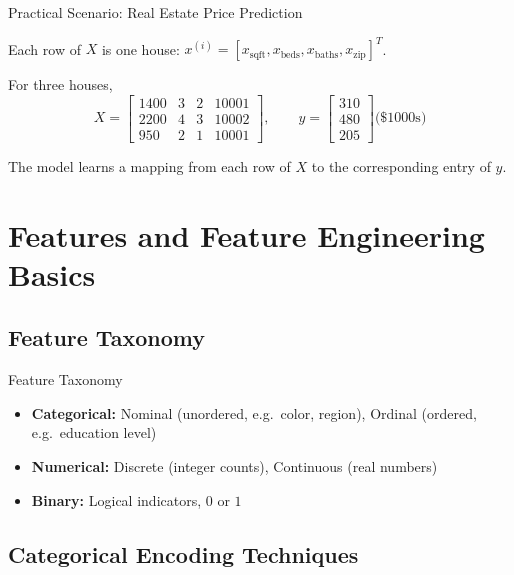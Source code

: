 \begin{frame}{Practical Scenario: Real Estate Price Prediction}
    \begin{sitemize}
        \item Each row of $X$ is one house: $x^{(i)} = [x_{\text{sqft}}, x_{\text{beds}}, x_{\text{baths}}, x_{\text{zip}}]^T$.
        \item For three houses,
        $$X = \begin{bmatrix} 1400 & 3 & 2 & 10001 \\ 2200 & 4 & 3 & 10002 \\ 950 & 2 & 1 & 10001 \end{bmatrix}, \qquad y = \begin{bmatrix} 310 \\ 480 \\ 205 \end{bmatrix} \text{(\$1000s)}$$
        \item The model learns a mapping from each row of $X$ to the corresponding entry of $y$.
    \end{sitemize}
\end{frame}


\section{Features and Feature Engineering Basics}

\subsection{Feature Taxonomy}


\begin{frame}{Feature Taxonomy}
    \begin{itemize}
        \item \textbf{Categorical:} Nominal (unordered, e.g.\ color, region), Ordinal (ordered, e.g.\ education level)
        \item \textbf{Numerical:} Discrete (integer counts), Continuous (real numbers)
        \item \textbf{Binary:} Logical indicators, $0$ or $1$
    \end{itemize}
\end{frame}


\subsection{Categorical Encoding Techniques}


